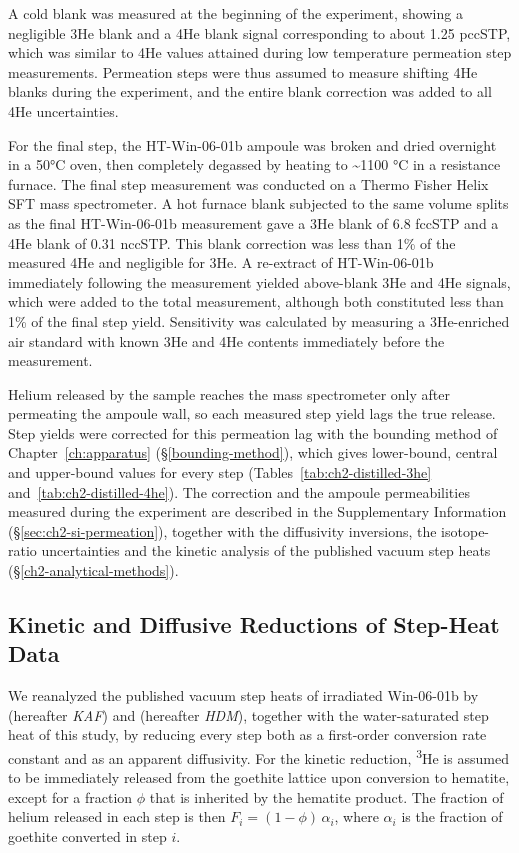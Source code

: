 A cold blank was measured at the beginning of the experiment, showing a
negligible 3He blank and a 4He blank signal
corresponding to about 1.25 pccSTP, which was similar to 4He values
attained during low temperature permeation step measurements. Permeation
steps were thus assumed to measure shifting 4He blanks during the
experiment, and the entire blank correction was added to all 4He
uncertainties.

For the final step, the HT-Win-06-01b ampoule was broken and dried
overnight in a 50°C oven, then completely degassed by heating to
\textasciitilde1100 °C in a resistance furnace. The final step
measurement was conducted on a Thermo Fisher Helix SFT mass spectrometer. A
hot furnace blank subjected to the same volume splits as the final
HT-Win-06-01b measurement gave a 3He blank of 6.8 fccSTP and a 4He blank
of 0.31 nccSTP. This blank correction was less than 1\% of the measured
4He and negligible for 3He. A re-extract of HT-Win-06-01b immediately
following the measurement yielded above-blank 3He and 4He signals, which
were added to the total measurement, although both constituted less than
1\% of the final step yield. Sensitivity was calculated by measuring a
3He-enriched air standard with known 3He and 4He contents immediately
before the measurement.

Helium released by the sample reaches the mass spectrometer only after permeating the ampoule
wall, so each measured step yield lags the true release. Step yields were corrected for this
permeation lag with the bounding method of Chapter~\ref{ch:apparatus} (\S\ref{bounding-method}),
which gives lower-bound, central and upper-bound values for every step
(Tables~\ref{tab:ch2-distilled-3he} and~\ref{tab:ch2-distilled-4he}). The correction and the
ampoule permeabilities measured during the experiment are described in the Supplementary
Information (\S\ref{sec:ch2-si-permeation}), together with the diffusivity inversions, the
isotope-ratio uncertainties and the kinetic analysis of the published vacuum step heats
(\S\ref{ch2-analytical-methods}).

\subsection{Kinetic and Diffusive Reductions of Step-Heat Data}\label{sec:gt_kin_methods}

We reanalyzed the published vacuum step heats of irradiated Win-06-01b by \citet{farley2024} (hereafter \emph{KAF}) and
\citet{monteiro2017} (hereafter \emph{HDM}), together with the water-saturated step heat of this study, by reducing every step
both as a first-order conversion rate constant and as an apparent diffusivity.
For the kinetic reduction,
\textsuperscript{3}He is assumed to be immediately released from the goethite lattice upon conversion to hematite, except for a fraction $\phi$ 
that is inherited by the hematite product. The fraction of helium released in each step is then $F_i = (1-\phi)\,\alpha_i$, where $\alpha_i$ 
is the fraction of goethite converted in step $i$.

